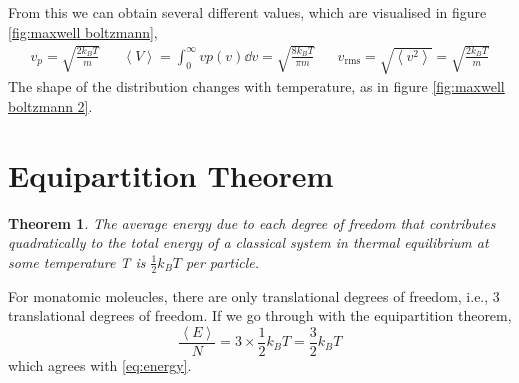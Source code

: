 \documentclass{book}
\newtheorem*{theorem}{Theorem}
\begin{document}
From this we can obtain several different values, which are visualised in figure \ref{fig:maxwell boltzmann},
\begin{align}
	v_p = \sqrt{\frac{2k_BT}{m}} && \left<V\right> = \int_0^{\infty} vp(v) \dd{v} = \sqrt{\frac{8k_BT}{\pi m}} && v_{\text{rms}} = \sqrt{\left<v^2\right>} = \sqrt{\frac{2k_BT}{m}} 
\end{align}
The shape of the distribution changes with temperature, as in figure \ref{fig:maxwell boltzmann 2}.
\section{Equipartition Theorem}
\begin{theorem}
	The average energy due to each degree of freedom that contributes quadratically to the total energy of a classical system in thermal equilibrium at some temperature T is $\frac{1}{2}k_BT$ per particle. 
\end{theorem}
For monatomic moleucles, there are only translational degrees of freedom, i.e., 3 translational degrees of freedom. If we go through with the equipartition theorem, 
\begin{equation}
	\frac{\left<E\right>}{N} = 3 \times \frac{1}{2}k_B T = \frac{3}{2}k_BT
\end{equation}
which agrees with \eqref{eq:energy}.
\end{document}
